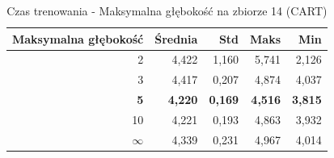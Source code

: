 \begin{table}[htbp]
\centering
\small
\setlength{\tabcolsep}{6pt}
\renewcommand{\arraystretch}{1.2}
\caption{Czas trenowania - Maksymalna głębokość na zbiorze 14 (CART)}
\label{tab:CART_max_depth_14_time}
\begin{tabular}{r|r|r|r|r}
\toprule
Maksymalna głębokość & Średnia & Std & Maks & Min \\
\hline
2 & 4,422 & 1,160 & 5,741 & 2,126 \\
3 & 4,417 & 0,207 & 4,874 & 4,037 \\
\textbf{5} & \textbf{4,220} & \textbf{0,169} & \textbf{4,516} & \textbf{3,815} \\
10 & 4,221 & 0,193 & 4,863 & 3,932 \\
$\infty$ & 4,339 & 0,231 & 4,967 & 4,014 \\
\bottomrule
\end{tabular}
\end{table}